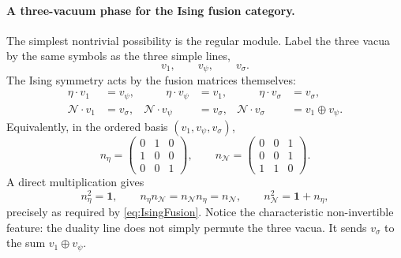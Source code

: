 \documentclass[11pt]{article}
\newcommand{\cN}{\mathcal{N}}
\begin{document}
\paragraph{A three-vacuum phase for the Ising fusion category.}
The simplest nontrivial possibility is the regular module.  Label the three vacua by the same symbols as the three simple lines,
\begin{equation}
  v_1,
  \qquad
  v_\psi,
  \qquad
  v_\sigma .
\end{equation}
The Ising symmetry acts by the fusion matrices themselves:
\begin{equation}
\begin{aligned}
  \eta\cdot v_1&=v_\psi,
  &\qquad
  \eta\cdot v_\psi&=v_1,
  &\qquad
  \eta\cdot v_\sigma&=v_\sigma,\\
  \cN\cdot v_1&=v_\sigma,
  &
  \cN\cdot v_\psi&=v_\sigma,
  &
  \cN\cdot v_\sigma&=v_1\oplus v_\psi .
\end{aligned}
\label{eq:IsingRegularModuleAction}
\end{equation}
Equivalently, in the ordered basis $(v_1,v_\psi,v_\sigma)$,
\begin{equation}
  n_\eta=
  \begin{pmatrix}
    0&1&0\\
    1&0&0\\
    0&0&1
  \end{pmatrix},
  \qquad
  n_\cN=
  \begin{pmatrix}
    0&0&1\\
    0&0&1\\
    1&1&0
  \end{pmatrix} .
  \label{eq:IsingRegularModuleMatrices}
\end{equation}
A direct multiplication gives
\begin{equation}
  n_\eta^2=\mathbf 1,
  \qquad
  n_\eta n_\cN=n_\cN n_\eta=n_\cN,
  \qquad
  n_\cN^2=\mathbf 1+n_\eta,
\end{equation}
precisely as required by \eqref{eq:IsingFusion}.  Notice the characteristic non-invertible feature: the duality line does not simply permute the three vacua.  It sends $v_\sigma$ to the sum $v_1\oplus v_\psi$.
\end{document}
